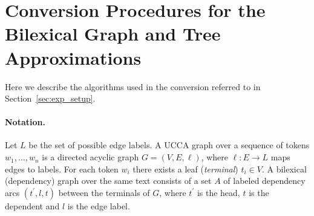 \documentclass[11pt,a4paper]{article}
\newcommand{\secref}[1]{Section~\ref{#1}}
\begin{document}
\begin{table}
\caption{Rules for extracting linguistic constructions.
All rules are on UCCA edges. For an edge $e$ in the graph,
$e.T$ refers to the set of tokens in $e$'s yield,
and $e.P$ to their coarse parts of speech.
$e.C$ refers to the set of outgoing edges from the edge's child,
and $e.\ell$ to the edge's UCCA label.}
\label{tab:constructions_rules}
\end{table}

\section{Conversion Procedures for the Bilexical Graph and Tree Approximations}
\label{appendix:conversion}

Here we describe the algorithms used in the conversion referred to in \secref{sec:exp_setup}.

\paragraph{Notation.}
Let $L$ be the set of possible edge labels.
A UCCA graph over a sequence of tokens $w_1, \ldots, w_n$ is a directed acyclic graph
$G=(V,E, \ell)$, where $\ell:E\to L$ maps edges to labels.
For each token $w_i$ there exists a leaf (\emph{terminal}) $t_i \in V$.
A bilexical (dependency) graph over the same text consists of a set $A$ of
labeled dependency arcs $(t^\prime,l,t)$
between the terminals of $G$, where $t^\prime$ is the head, $t$ is the dependent and $l$ is
the edge label.
\end{document}
